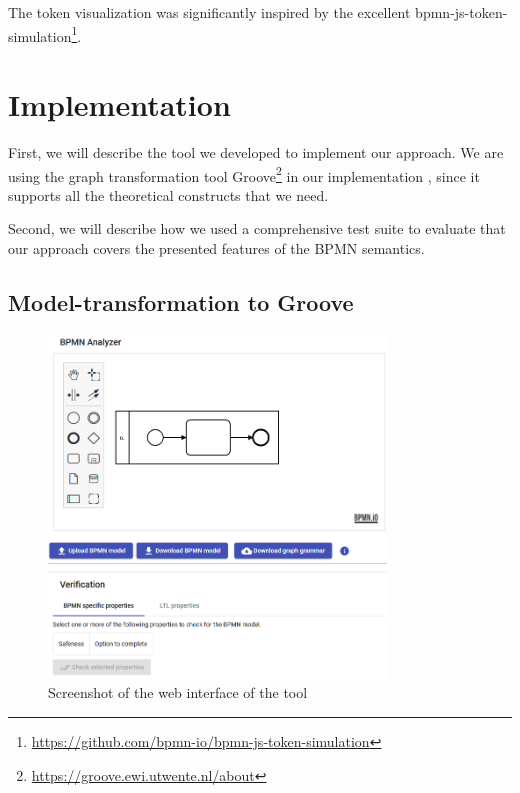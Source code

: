 \documentclass[adraft, copyright, creativecommons]{eptcs} %
\begin{document}
The token visualization was significantly inspired by the excellent bpmn-js-token-simulation\footnote{\url{https://github.com/bpmn-io/bpmn-js-token-simulation}}.

\section{Implementation}
First, we will describe the tool we developed to implement our approach.
We are using the graph transformation tool Groove\footnote{\url{https://groove.ewi.utwente.nl/about}} in our implementation \cite{ghamarianModellingAnalysisUsing2012, rensinkGROOVESimulatorTool2004}, since it supports all the theoretical constructs that we need.

Second, we will describe how we used a comprehensive test suite to evaluate that our approach covers the presented features of the BPMN semantics.
\subsection{Model-transformation to Groove}

\begin{figure}[h]
    \centering
    \includegraphics[width=0.8\textwidth]{images/impl.png}
    \caption{Screenshot of the web interface of the tool}
    \label{fig:implScreenshot}
\end{figure}
\end{document}
